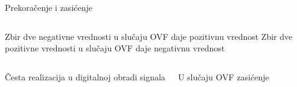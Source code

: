 
\begin{frame}[label=05-s029]{Prekoračenje i zasićenje}
\fontsize{10}{12}\selectfont

\begin{columns}[c,onlytextwidth]
Zbir dve negativne vrednosti u slučaju OVF daje pozitivnu vrednost
\centering\def\DEsaturacija{0}
Zbir dve pozitivne vrednosti u slučaju OVF daje negativnu vrednost
\end{columns}\par\vspace{4mm}
\begin{columns}[c,onlytextwidth]
\centering{}
\centering Česta realizacija u digitalnoj obradi signala\par\vspace{4mm}U slučaju OVF zasićenje
\end{columns}
\end{frame}
